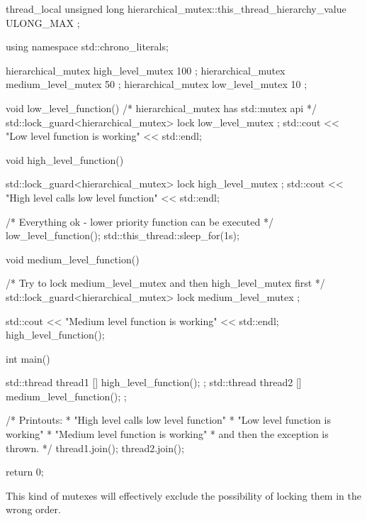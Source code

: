 \documentclass[../main]{subfiles}
\begin{document}
\begin{Code}
    thread_local unsigned long
        hierarchical_mutex::this_thread_hierarchy_value { ULONG_MAX };

    using namespace std::chrono_literals;

    hierarchical_mutex high_level_mutex { 100 };
    hierarchical_mutex medium_level_mutex { 50 };
    hierarchical_mutex low_level_mutex { 10 } ;

    void low_level_function()
    {
        /* hierarchical_mutex has std::mutex api */
        std::lock_guard<hierarchical_mutex> lock { low_level_mutex };
        std::cout << "Low level function is working" << std::endl;
    }

    void high_level_function()
    {
        std::lock_guard<hierarchical_mutex> lock { high_level_mutex };
        std::cout << "High level calls low level function" << std::endl;

        /* Everything ok - lower priority function can be executed */
        low_level_function();
        std::this_thread::sleep_for(1s);
    }

    void medium_level_function()
    {
        /* Try to lock medium_level_mutex and then high_level_mutex first */
        std::lock_guard<hierarchical_mutex> lock { medium_level_mutex };

        std::cout << "Medium level function is working" << std::endl;
        high_level_function();
    }

    int main()
    {
        std::thread thread1 { [] { high_level_function(); } };
        std::thread thread2 { [] { medium_level_function(); }};

        /* Printouts:
        * "High level calls low level function"
        * "Low level function is working"
        * "Medium level function is working"
        * and then the exception is thrown.
        */
        thread1.join();
        thread2.join();

        return 0;
    }
\end{Code}
\noindent
This kind of mutexes will effectively exclude the possibility of locking them in the wrong order.\newline
\end{document}
